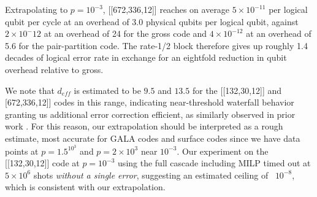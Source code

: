 Extrapolating to $p = 10^{-3}$, [[672,336,12]] reaches on average $5 \times 10^{-11}$ per logical qubit per cycle at an overhead of 3.0 physical qubits per logical qubit, against $2 \times 10^-12$ at an overhead of 24 for the gross code and $4 \times 10^{-12}$ at an overhead of 5.6 for the pair-partition code. The rate-1/2 block therefore gives up roughly 1.4 decades of logical error rate in exchange for an eightfold reduction in qubit overhead relative to gross. 

We note that $d_{eff}$ is estimated to be $9.5$ and $13.5$ for the [[132,30,12]] and [672,336,12]] codes in this range, indicating near-threshold waterfall behavior granting us additional error correction efficient, as similarly observed in prior work \cite{kasai2026breakingorthogonalitybarrierquantum,zhao2026ultrahighratequantumerrorcorrection}. For this reason, our extrapolation should be interpreted as a rough estimate, most accurate for GALA codes and surface codes since we have data points at $p = 1.5^10^3$ and $p = 2\times 10^{3}$ near $10^{-3}$. Our experiment on the [[132,30,12]] code at $p = 10^{-3}$ using the full cascade including MILP \cite{zhao2026ultrahighratequantumerrorcorrection} timed out at $5\times 10^6$ shots \emph{without a single error}, suggesting an estimated ceiling of ~$10^{-8}$, which is consistent with our extrapolation.  








